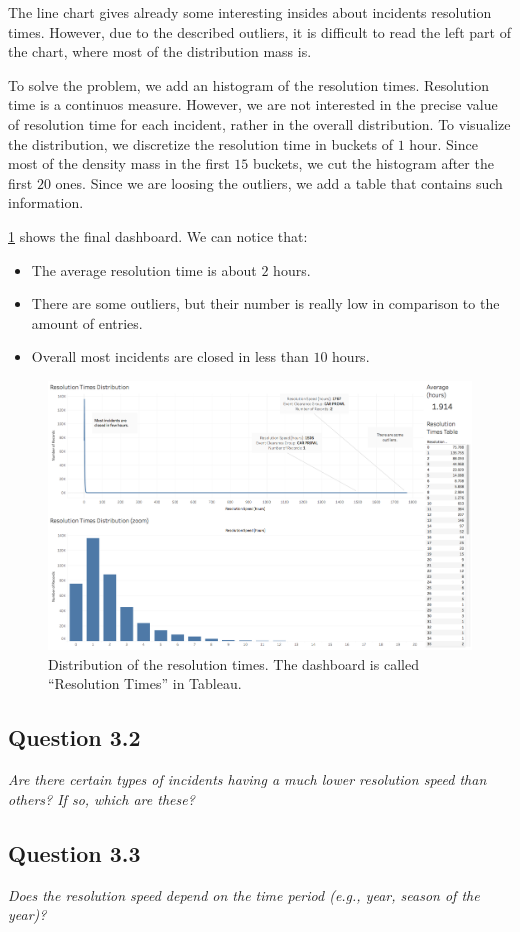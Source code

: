 The line chart gives already some interesting insides about incidents resolution times.
However, due to the described outliers, it is difficult to read the left part of the chart, where most of the distribution mass is.

To solve the problem, we add an histogram of the resolution times.
Resolution time is a continuos measure.
However, we are not interested in the precise value of resolution time for each incident, rather in the overall distribution.
To visualize the distribution, we discretize the resolution time in buckets of $1$ hour.
Since most of the density mass in the first $15$ buckets, we cut the histogram after the first $20$ ones.
Since we are loosing the outliers, we add a table that contains such information.

\cref{fig:3_1_resolution_speed} shows the final dashboard.
We can notice that:
\begin{itemize}
    \item The average resolution time is about $2$ hours.
    \item There are some outliers, but their number is really low in comparison to the amount of entries.
    \item Overall most incidents are closed in less than $10$ hours.
\end{itemize}

\begin{figure}[h]
	\centering
	\includegraphics[width=\columnwidth]{figures/3_1_resolution_speed}
	\caption{Distribution of the resolution times. The dashboard is called ``Resolution Times'' in Tableau.}
	\label{fig:3_1_resolution_speed}
\end{figure}


\subsection*{Question 3.2}
\textit{Are there certain types of incidents having a much lower resolution speed than others? If so, which are these?}



\subsection*{Question 3.3}
\textit{Does the resolution speed depend on the time period (e.g., year, season of the year)?}
